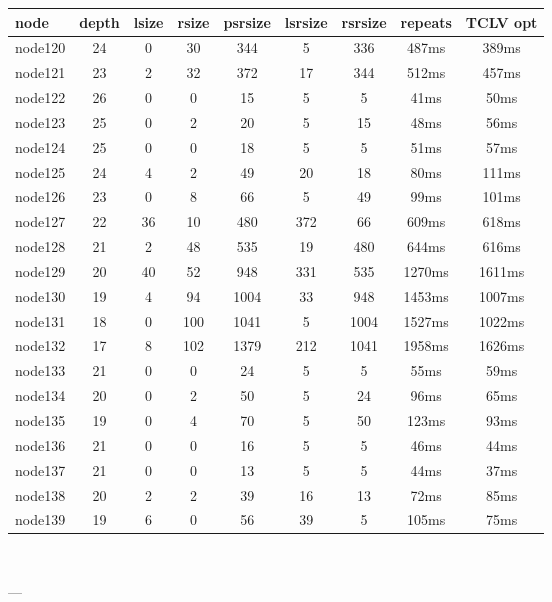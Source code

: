 \begin{tabular}{|l|c|c|c|c|c|c|c|c|}
\hline node & depth & lsize & rsize & psrsize & lsrsize & rsrsize   & repeats & TCLV opt\\
    \hline node120 & 24 & 0 & 30 & 344 & 5 & 336 & 487ms & 389ms\\
    \hline node121 & 23 & 2 & 32 & 372 & 17 & 344 & 512ms & 457ms\\
    \hline node122 & 26 & 0 & 0 & 15 & 5 & 5 & 41ms & 50ms\\
    \hline node123 & 25 & 0 & 2 & 20 & 5 & 15 & 48ms & 56ms\\
    \hline node124 & 25 & 0 & 0 & 18 & 5 & 5 & 51ms & 57ms\\
    \hline node125 & 24 & 4 & 2 & 49 & 20 & 18 & 80ms & 111ms\\
    \hline node126 & 23 & 0 & 8 & 66 & 5 & 49 & 99ms & 101ms\\
    \hline node127 & 22 & 36 & 10 & 480 & 372 & 66 & 609ms & 618ms\\
    \hline node128 & 21 & 2 & 48 & 535 & 19 & 480 & 644ms & 616ms\\
    \hline node129 & 20 & 40 & 52 & 948 & 331 & 535 & 1270ms & 1611ms\\
    \hline node130 & 19 & 4 & 94 & 1004 & 33 & 948 & 1453ms & 1007ms\\
    \hline node131 & 18 & 0 & 100 & 1041 & 5 & 1004 & 1527ms & 1022ms\\
    \hline node132 & 17 & 8 & 102 & 1379 & 212 & 1041 & 1958ms & 1626ms\\
    \hline node133 & 21 & 0 & 0 & 24 & 5 & 5 & 55ms & 59ms\\
    \hline node134 & 20 & 0 & 2 & 50 & 5 & 24 & 96ms & 65ms\\
    \hline node135 & 19 & 0 & 4 & 70 & 5 & 50 & 123ms & 93ms\\
    \hline node136 & 21 & 0 & 0 & 16 & 5 & 5 & 46ms & 44ms\\
    \hline node137 & 21 & 0 & 0 & 13 & 5 & 5 & 44ms & 37ms\\
    \hline node138 & 20 & 2 & 2 & 39 & 16 & 13 & 72ms & 85ms\\
    \hline node139 & 19 & 6 & 0 & 56 & 39 & 5 & 105ms & 75ms\\

\hline
\end{tabular} \

---


